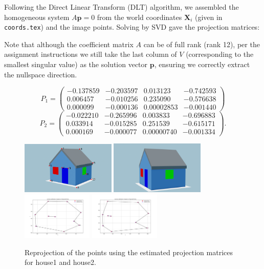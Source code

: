 Following the Direct Linear Transform (DLT) algorithm, we assembled the homogeneous system $A\mathbf{p}=0$ from the world coordinates $\mathbf{X}_i$ (given in \texttt{coords.tex}) and the image points. Solving by SVD gave the projection matrices:

Note that although the coefficient matrix $A$ can be of full rank (rank 12), per the assignment instructions we still take the last column of $V$ (corresponding to the smallest singular value) as the solution vector $\mathbf{p}$, ensuring we correctly extract the nullspace direction.


\[
P_1 = \begin{pmatrix}
-0.137859 & -0.203597 & 0.013123 & -0.742593 \\
 0.006457 & -0.010256 & 0.235090 & -0.576638 \\
 0.000099 & -0.000136 & 0.00002853 & -0.001440
\end{pmatrix}
\]
\[
P_2 = \begin{pmatrix}
-0.022210 & -0.265996 & 0.003833 & -0.696883 \\
 0.033914 & -0.015285 & 0.251539 & -0.615171 \\
 0.000169 & -0.000077 & 0.00000740 & -0.001334
\end{pmatrix}.
\]


\begin{figure}[H]
  \centering
  \includegraphics[width=0.4\textwidth]{../Assets/0.png}
  \includegraphics[width=0.4\textwidth]{../Assets/house2.png}
  \includegraphics[width=0.3\textwidth]{../Assets/img1.png}
  \hspace{1.3cm}
  \includegraphics[width=0.3\textwidth]{../Assets/img2.png}
  \caption{Reprojection of the points using the estimated projection matrices for house1 and house2.}
  \label{fig:reproj}
\end{figure}

